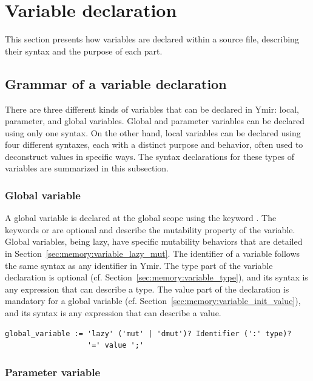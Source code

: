 \section{Variable declaration}
\label{sec:memory:local_variable_declaration}

This section presents how variables are declared within a source file,
describing their syntax and the purpose of each part.

\subsection{Grammar of a variable declaration}

There are three different kinds of variables that can be declared in Ymir:
local, parameter, and global variables. Global and parameter variables can be
declared using only one syntax. On the other hand, local variables can be
declared using four different syntaxes, each with a distinct purpose and
behavior, often used to deconstruct values in specific ways. The syntax
declarations for these types of variables are summarized in this subsection.

\subsubsection*{Global variable}

A global variable is declared at the global scope using the keyword
. The keywords  or  are optional and describe
the mutability property of the variable. Global variables, being lazy, have
specific mutability behaviors that are detailed in
Section~\ref{sec:memory:variable_lazy_mut}. The identifier of a variable follows the
same syntax as any identifier in Ymir. The type part of the variable declaration
is optional (cf. Section~\ref{sec:memory:variable_type}), and its syntax is any
expression that can describe a type. The value part of the declaration is
mandatory for a global variable (cf. Section~\ref{sec:memory:variable_init_value}), and
its syntax is any expression that can describe a value.

\begin{lstlisting}[style=bashVerb]
global_variable := 'lazy' ('mut' | 'dmut')? Identifier (':' type)?
                   '=' value ';'
\end{lstlisting}

\subsubsection*{Parameter variable}

